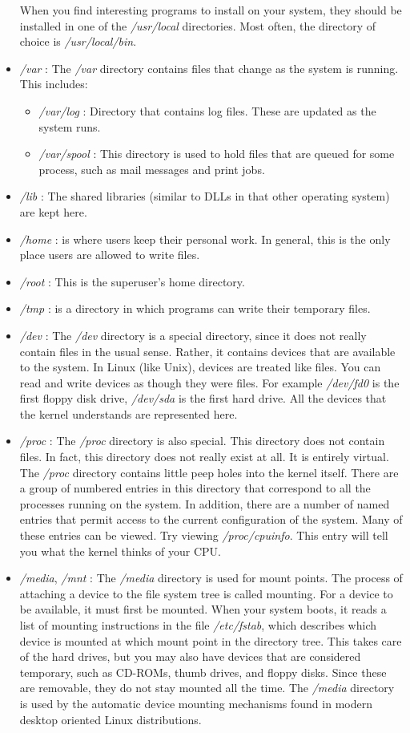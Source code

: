 \documentclass[10pt,letterpaper]{book}
\begin{document}
\begin{itemize}
When you find interesting programs to install on your system, they should be installed in one of the \textit{/usr/local} directories. Most often, the directory of choice is \textit{/usr/local/bin}. 
\item \textit{/var} : The \textit{/var} directory contains files that change as the system is running. This includes: 
\begin{itemize}
\item \textit{/var/log} : Directory that contains log files. These are updated as the system runs.
\item \textit{/var/spool} : This directory is used to hold files that are queued for some process, such as mail messages and print jobs. 
\end{itemize}
\item \textit{/lib} : The shared libraries (similar to DLLs in that other operating system) are kept here.
\item \textit{/home} : is where users keep their personal work. In general, this is the only place users are allowed to write files.
\item \textit{/root} : This is the superuser's home directory.
\item \textit{/tmp} : is a directory in which programs can write their temporary files.
\item \textit{/dev} : The \textit{/dev} directory is a special directory, since it does not really contain files in the usual sense. Rather, it contains devices that are available to the system. In Linux (like Unix), devices are treated like files. You can read and write devices as though they were files. For example \textit{/dev/fd0} is the first floppy disk drive, \textit{/dev/sda} is the first hard drive. All the devices that the kernel understands are represented here.
\item \textit{/proc} : The \textit{/proc} directory is also special. This directory does not contain files. In fact, this directory does not really exist at all. It is entirely virtual. The \textit{/proc} directory contains little peep holes into the kernel itself. There are a group of numbered entries in this directory that correspond to all the processes running on the system. In addition, there are a number of named entries that permit access to the current configuration of the system. Many of these entries can be viewed. Try viewing \textit{/proc/cpuinfo}. This entry will tell you what the kernel thinks of your CPU.
\item \textit{/media}, \textit{/mnt} : The \textit{/media} directory is used for mount points. The process of attaching a device to the file system tree is called mounting. For a device to be available, it must first be mounted. When your system boots, it reads a list of mounting instructions in the file \textit{/etc/fstab}, which describes which device is mounted at which mount point in the directory tree. This takes care of the hard drives, but you may also have devices that are considered temporary, such as CD-ROMs, thumb drives, and floppy disks. Since these are removable, they do not stay mounted all the time. The \textit{/media} directory is used by the automatic device mounting mechanisms found in modern desktop oriented Linux distributions.\\

\end{itemize}
\end{document}
